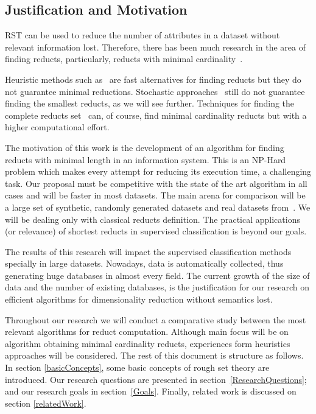 \documentclass[11pt]{article}   %
\begin{document}
\subsection{Justification and Motivation}\label{Justification}{
  RST can be used to reduce the number of attributes in a dataset without relevant information lost. 
  Therefore, there has been much research in the area of finding reducts, particularly, reducts with 
  minimal cardinality~\cite{Jensen14}. 
  
  Heuristic methods such as~\cite{Chouchoulas01,Jensen04,Lin04,Zhong01} are fast alternatives for finding 
  reducts but they do not guarantee minimal reductions. Stochastic approaches~\cite{Wroblewski95,Jensen03,
  Chen10,Wang07} still do not guarantee finding the smallest reducts, as we will see further. Techniques 
  for finding the complete reducts set~\cite{Ruiz85,Santiesteban03,Sanchez07,Lias09} can, of course, find 
  minimal cardinality reducts but with a higher computational effort.
  
  The motivation of this work is the development of an algorithm for finding reducts with minimal length 
  in an information system. This is an NP-Hard problem which makes every attempt for reducing its execution
  time, a challenging task. Our proposal must be competitive with the state of the art algorithm in all 
  cases and will be faster in most datasets. The main arena for comparison will be a large set of synthetic,
  randomly generated datasets and real datasets from~\cite{Bache13}. We will be dealing only with classical
  reducts definition. The practical applications (or relevance) of shortest reducts in supervised classification
  is beyond our goals.
  
  The results of this research will impact the supervised classification methods specially in large datasets.
  Nowadays, data is automatically collected, thus generating huge databases in almost every field. The 
  current growth of the size of data and the number of existing databases, is the justification for our
  research on efficient algorithms for dimensionality reduction without semantics lost.}  
    
  Throughout our research we will conduct a comparative study between the most relevant algorithms for reduct 
  computation. Although main focus will be on algorithm obtaining minimal cardinality reducts, experiences 
  form heuristics approaches will be considered. The rest of this document is structure as follows. In section
  \ref{basicConcepts}, some basic concepts of rough set theory are introduced. Our research questions are 
  presented in section~\ref{ResearchQuestions}; and our research goals in section~\ref{Goals}. Finally, 
  related work is discussed on section \ref{relatedWork}.
\end{document}
